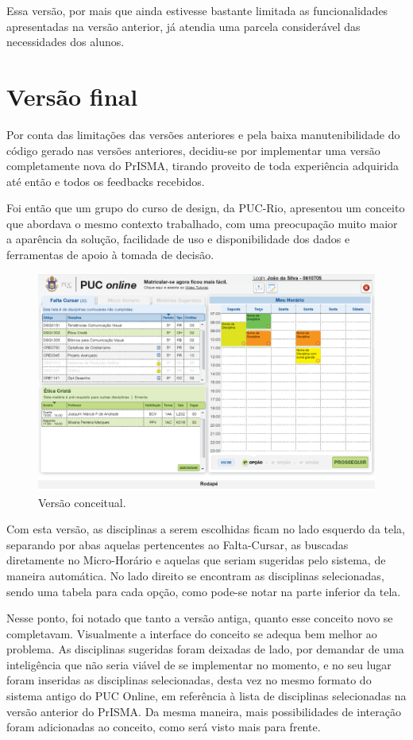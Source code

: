 \documentclass[graduacao,brazil]{ThesisPUC}
\begin{document}
Essa versão, por mais que ainda estivesse bastante limitada as funcionalidades apresentadas na versão anterior, já atendia uma parcela considerável das necessidades dos alunos.  


\section{Versão final}

Por conta das limitações das versões anteriores e pela baixa manutenibilidade do código gerado nas versões anteriores, decidiu-se por implementar uma versão completamente nova do PrISMA, tirando proveito de toda experiência adquirida até então e todos os feedbacks recebidos.

Foi então que um grupo do curso de design, da PUC-Rio, apresentou um conceito que abordava o mesmo contexto trabalhado, com uma preocupação muito maior a aparência da solução, facilidade de uso e disponibilidade dos dados e ferramentas de apoio à tomada de decisão.

\begin{figure}[H]
    \centering
    \includegraphics[width=\linewidth]{img/designer.png}
    \caption{Versão conceitual.}
\end{figure}

Com esta versão, as disciplinas a serem escolhidas ficam no lado esquerdo da tela, separando por abas aquelas pertencentes ao Falta-Cursar, as buscadas diretamente no Micro-Horário e aquelas que seriam sugeridas pelo sistema, de maneira automática. No lado direito se encontram as disciplinas selecionadas, sendo uma tabela para cada opção, como pode-se notar na parte inferior da tela.

Nesse ponto, foi notado que tanto a versão antiga, quanto esse conceito novo se completavam. Visualmente a interface do conceito se adequa bem melhor ao problema. As disciplinas sugeridas foram deixadas de lado, por demandar de uma inteligência que não seria viável de se implementar no momento, e no seu lugar foram inseridas as disciplinas selecionadas, desta vez no mesmo formato do sistema antigo do PUC Online, em referência à lista de disciplinas selecionadas na versão anterior do PrISMA. Da mesma maneira, mais possibilidades de interação foram adicionadas ao conceito, como será visto mais para frente.
\end{document}
